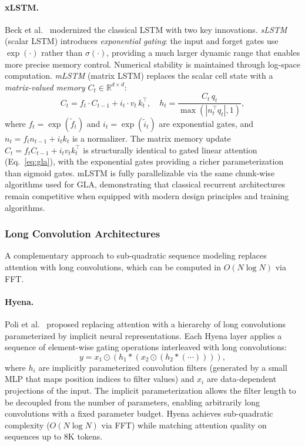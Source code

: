 \paragraph{xLSTM.}
Beck et al.~\cite{beck2024xlstm} modernized the classical LSTM with two key innovations. \emph{sLSTM} (scalar LSTM) introduces \emph{exponential gating}: the input and forget gates use $\exp(\cdot)$ rather than $\sigma(\cdot)$, providing a much larger dynamic range that enables more precise memory control. Numerical stability is maintained through log-space computation. \emph{mLSTM} (matrix LSTM) replaces the scalar cell state with a \emph{matrix-valued memory} $C_t \in \mathbb{R}^{d \times d}$:
\begin{equation}
C_t = f_t \cdot C_{t-1} + i_t \cdot v_t\, k_t^\top, \quad h_t = \frac{C_t\, q_t}{\max(|n_t^\top q_t|, 1)},
\label{eq:mlstm}
\end{equation}
where $f_t = \exp(\tilde{f}_t)$ and $i_t = \exp(\tilde{i}_t)$ are exponential gates, and $n_t = f_t n_{t-1} + i_t k_t$ is a normalizer. The matrix memory update $C_t = f_t C_{t-1} + i_t v_t k_t^\top$ is structurally identical to gated linear attention (Eq.~\ref{eq:gla}), with the exponential gates providing a richer parameterization than sigmoid gates. mLSTM is fully parallelizable via the same chunk-wise algorithms used for GLA, demonstrating that classical recurrent architectures remain competitive when equipped with modern design principles and training algorithms.

\subsubsection{Long Convolution Architectures}
\label{subsubsec:long-conv}

A complementary approach to sub-quadratic sequence modeling replaces attention with long convolutions, which can be computed in $O(N \log N)$ via FFT.

\paragraph{Hyena.}
Poli et al.~\cite{poli2023hyena} proposed replacing attention with a hierarchy of long convolutions parameterized by implicit neural representations. Each Hyena layer applies a sequence of element-wise gating operations interleaved with long convolutions:
\begin{equation}
y = x_1 \odot (h_1 * (x_2 \odot (h_2 * (\cdots)))),
\label{eq:hyena}
\end{equation}
where $h_i$ are implicitly parameterized convolution filters (generated by a small MLP that maps position indices to filter values) and $x_i$ are data-dependent projections of the input. The implicit parameterization allows the filter length to be decoupled from the number of parameters, enabling arbitrarily long convolutions with a fixed parameter budget. Hyena achieves sub-quadratic complexity ($O(N \log N)$ via FFT) while matching attention quality on sequences up to 8K tokens.

